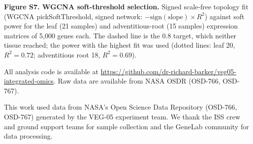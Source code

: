 \documentclass[pdflatex,sn-nature]{sn-jnl}
\begin{document}
\noindent\textbf{Figure S7. WGCNA soft-threshold selection.} Signed scale-free topology fit (WGCNA pickSoftThreshold, signed network: \(-\mathrm{sign}(\mathrm{slope}) \times R^2\)) against soft power for the leaf (21 samples) and adventitious-root (15 samples) expression matrices of 5{,}000 genes each. The dashed line is the 0.8 target, which neither tissue reached; the power with the highest fit was used (dotted lines: leaf 20, \(R^2 = 0.72\); adventitious root 18, \(R^2 = 0.69\)).

\backmatter

All analysis code is available at
\url{https://github.com/dr-richard-barker/veg05-integrated-omics}. Raw data are
available from NASA OSDR (OSD-766, OSD-767).

This work used data from NASA's Open Science Data Repository (OSD-766, OSD-767)
generated by the VEG-05 experiment team. We thank the ISS crew and ground support
teams for sample collection and the GeneLab community for data processing.


\end{document}
